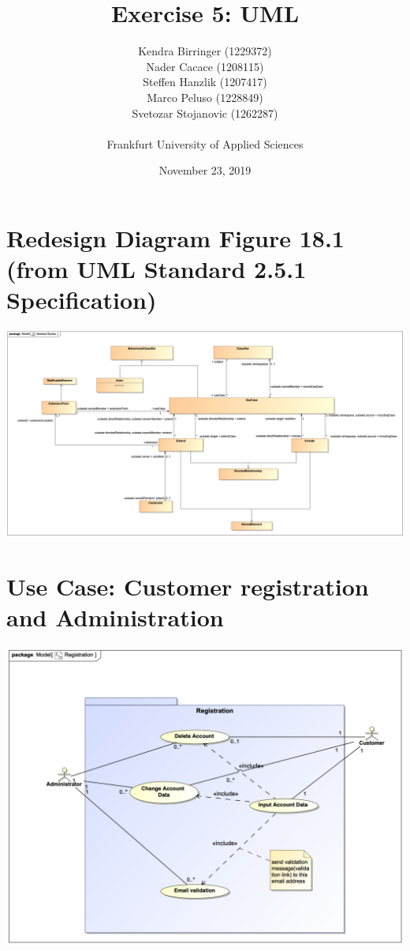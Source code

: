 \documentclass[a4paper, 12pt]{article}
\title{Exercise 5: UML}
\author{
    Kendra Birringer (1229372)\\
    Nader Cacace (1208115)\\
    Steffen Hanzlik (1207417)\\
    Marco Peluso (1228849)\\
    Svetozar Stojanovic (1262287)\\
    \\
    Frankfurt University of Applied Sciences
}
\date{November 23, 2019}
\begin{document}
\maketitle
\newpage
\tableofcontents

\newpage
\section{Redesign Diagram Figure 18.1 (from UML Standard 2.5.1 Specification\cite{uml251specpdf})}
\begin{center}
\includegraphics[scale=0.4, angle=90, origin=c]{01-abstract-syntax.png}
\end{center}

\section{Use Case: Customer registration and Administration}
\begin{center}
\includegraphics[scale=0.5]{02-e-bike-rental-service-variant-1-01.png}
\end{center}
\end{document}
